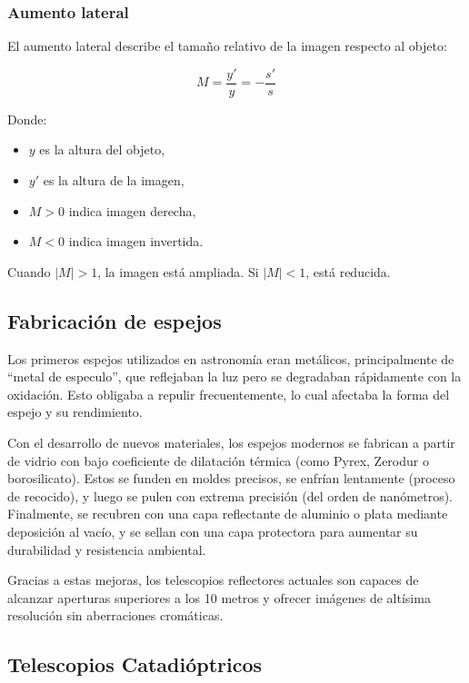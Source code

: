 \subsubsection*{Aumento lateral}

El aumento lateral describe el tamaño relativo de la imagen respecto al objeto:

\begin{equation}
	M = \frac{y'}{y} = -\frac{s'}{s}
	\label{eq:aumento_lateral}
\end{equation}

Donde:
\begin{itemize}
	\item $y$ es la altura del objeto,
	\item $y'$ es la altura de la imagen,
	\item $M > 0$ indica imagen derecha,
	\item $M < 0$ indica imagen invertida.
\end{itemize}

Cuando $|M| > 1$, la imagen está ampliada. Si $|M| < 1$, está reducida.

\subsection*{Fabricación de espejos}

Los primeros espejos utilizados en astronomía eran metálicos, principalmente de “metal de especulo”, que reflejaban la luz pero se degradaban rápidamente con la oxidación. Esto obligaba a repulir frecuentemente, lo cual afectaba la forma del espejo y su rendimiento.

Con el desarrollo de nuevos materiales, los espejos modernos se fabrican a partir de vidrio con bajo coeficiente de dilatación térmica (como Pyrex, Zerodur o borosilicato). Estos se funden en moldes precisos, se enfrían lentamente (proceso de recocido), y luego se pulen con extrema precisión (del orden de nanómetros). Finalmente, se recubren con una capa reflectante de aluminio o plata mediante deposición al vacío, y se sellan con una capa protectora para aumentar su durabilidad y resistencia ambiental.

Gracias a estas mejoras, los telescopios reflectores actuales son capaces de alcanzar aperturas superiores a los 10 metros y ofrecer imágenes de altísima resolución sin aberraciones cromáticas.


\subsection{Telescopios Catadióptricos}

